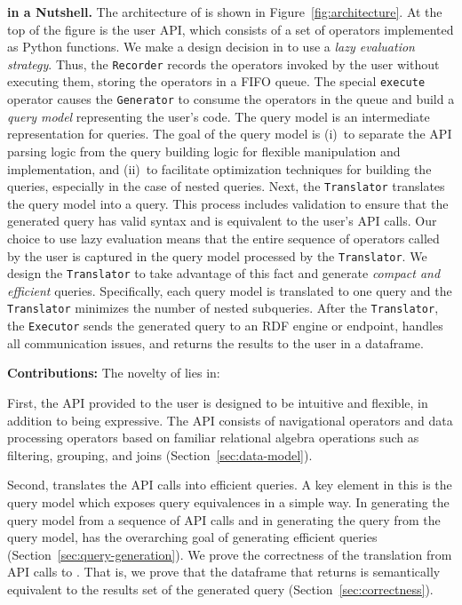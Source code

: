\noindent
\textbf{\rdfframes in a Nutshell.}
The architecture of \rdfframes is shown in Figure~\ref{fig:architecture}.
At the top of the figure is the user API, which consists of a set of operators implemented as Python functions.
We make a design decision in \rdfframes to use a \textit{lazy evaluation strategy}.
Thus, the \texttt{Recorder} records the operators invoked by the user without executing them,
storing the operators in a FIFO queue.
The special \texttt{execute} operator causes the 
\texttt{Generator} to consume the operators in the queue and build a {\em query model} representing the user's code.
The query model is an intermediate representation for
\sparql queries. The goal of the query model is (i)~to separate the API parsing logic from the query building logic for flexible manipulation and implementation, and (ii)~to facilitate optimization techniques for building the queries, especially in the case of nested queries.
Next, the \texttt{Translator} translates the query model into a \sparql query.
This process includes validation to ensure that the generated query has valid \sparql syntax and is equivalent to the user's API calls.
Our choice to use lazy evaluation means that the entire sequence of operators called by the user is captured in the query model processed by the \texttt{Translator}.
We design the \texttt{Translator} to take advantage of this fact and generate
\textit{compact and efficient} \sparql queries.
Specifically, each query model is translated to one \sparql query and the \texttt{Translator} minimizes the number of nested subqueries.
After the \texttt{Translator}, the \texttt{Executor} sends the
generated \sparql
query to an RDF engine or \sparql endpoint, handles all communication issues,
and returns the results to the user in a dataframe.

\noindent

\textbf{Contributions:}
The novelty of \rdfframes lies in:
\squishlist
\item
First, the API provided to the user is designed to be intuitive and flexible,
in addition to being expressive.
The API consists of navigational operators and data processing operators based on familiar relational algebra operations
such as filtering, grouping, and joins (Section~\ref{sec:data-model}).

\item
Second, \rdfframes translates the API calls into efficient \sparql queries.
A key element in this is the query model which exposes query equivalences in a simple way.
In generating the query model from a sequence of API calls and in generating the \sparql query from the query model,
\rdfframes has the overarching goal of generating efficient queries
(Section~\ref{sec:query-generation}).
We prove the correctness of the translation from API calls to \sparql. That is, we prove that the dataframe that \rdfframes returns is semantically equivalent to the results set of the generated \sparql query (Section~\ref{sec:correctness}).

